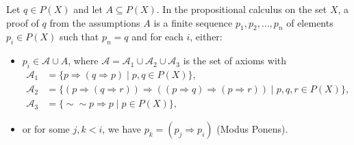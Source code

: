 Let $q \in P(X)$ and let $A \subseteq P(X)$. In the propositional calculus on the set $X$, a proof of $q$ from the assumptions $A$ is a finite sequence $p_1, p_2, \ldots, p_n$ of elements $p_i \in P(X)$ such that $p_n = q$ and for each $i$, either:
\begin{itemize}
\item $p_i \in \mathcal{A} \cup A$, where $\mathcal{A} = \mathcal{A}_1 \cup \mathcal{A}_2 \cup \mathcal{A}_3$ is the set of axioms with
\begin{align*}
\mathcal{A}_1 &= \{p \Rightarrow (q \Rightarrow p) \mid p, q \in P(X)\},\\
\mathcal{A}_2 &= \{(p \Rightarrow (q \Rightarrow r)) \Rightarrow ((p \Rightarrow q) \Rightarrow (p \Rightarrow r)) \mid p, q, r \in P(X)\},\\
\mathcal{A}_3 &= \{\sim\sim p \Rightarrow p \mid p \in P(X)\},
\end{align*}
\item or for some $j, k < i$, we have $p_k = (p_j \Rightarrow p_i)$ (Modus Ponens).
\end{itemize}
